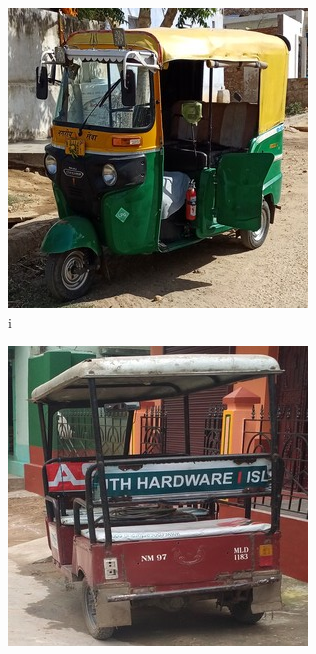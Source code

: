 \begin{enumerate}
        \begin{figure}[H]
        \centering
            \begin{subfigure}[b]{0.2\textwidth}
               \includegraphics[width=\textwidth]{images/dataset_images/bdd_samples/Auto_1.jpg}
               \caption{i}
               \label{Auto_1}
            \end{subfigure}
            \begin{subfigure}[b]{0.2\textwidth}
               \includegraphics[width=\textwidth, angle=-90 ]{images/dataset_images/bdd_samples/Auto_2.jpg}\hfill

\end{subfigure}
\end{figure}
\end{enumerate}
